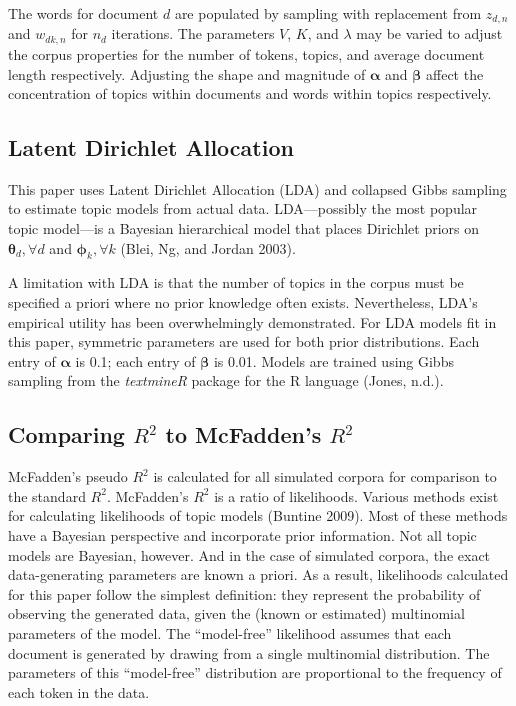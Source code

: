 \documentclass[conference,final,]{IEEEtran}
\begin{document}
The words for document \(d\) are populated by sampling with replacement
from \(z_{d,n}\) and \(w_{dk,n}\) for \(n_d\) iterations. The parameters
\(V\), \(K\), and \(\lambda\) may be varied to adjust the corpus
properties for the number of tokens, topics, and average document length
respectively. Adjusting the shape and magnitude of \(\boldsymbol\alpha\)
and \(\boldsymbol\beta\) affect the concentration of topics within
documents and words within topics respectively.

\hypertarget{latent-dirichlet-allocation}{%
\subsection{Latent Dirichlet
Allocation}\label{latent-dirichlet-allocation}}

This paper uses Latent Dirichlet Allocation (LDA) and collapsed Gibbs
sampling to estimate topic models from actual data. LDA---possibly the
most popular topic model---is a Bayesian hierarchical model that places
Dirichlet priors on \(\boldsymbol\theta_d, \forall d\) and
\(\boldsymbol\phi_k, \forall k\) (Blei, Ng, and Jordan 2003).

A limitation with LDA is that the number of topics in the corpus must be
specified a priori where no prior knowledge often exists. Nevertheless,
LDA's empirical utility has been overwhelmingly demonstrated. For LDA
models fit in this paper, symmetric parameters are used for both prior
distributions. Each entry of \(\boldsymbol\alpha\) is 0.1; each entry of
\(\boldsymbol\beta\) is 0.01. Models are trained using Gibbs sampling
from the \emph{textmineR} package for the R language (Jones, n.d.).

\hypertarget{comparing-r2-to-mcfaddens-r2}{%
\subsection{\texorpdfstring{Comparing \(R^2\) to McFadden's
\(R^2\)}{Comparing R\^{}2 to McFadden's R\^{}2}}\label{comparing-r2-to-mcfaddens-r2}}

McFadden's pseudo \(R^2\) is calculated for all simulated corpora for
comparison to the standard \(R^2\). McFadden's \(R^2\) is a ratio of
likelihoods. Various methods exist for calculating likelihoods of topic
models (Buntine 2009). Most of these methods have a Bayesian perspective
and incorporate prior information. Not all topic models are Bayesian,
however. And in the case of simulated corpora, the exact data-generating
parameters are known a priori. As a result, likelihoods calculated for
this paper follow the simplest definition: they represent the
probability of observing the generated data, given the (known or
estimated) multinomial parameters of the model. The ``model-free''
likelihood assumes that each document is generated by drawing from a
single multinomial distribution. The parameters of this ``model-free''
distribution are proportional to the frequency of each token in the
data.
\end{document}
